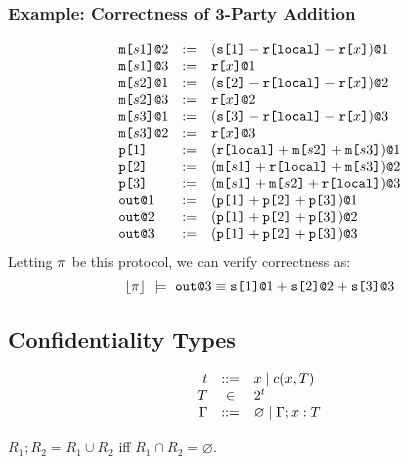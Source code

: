 \subsubsection{Example: Correctness of 3-Party Addition}

$$
\begin{array}{lll}
  \elab{\mesg{s1}}{2} &:=& \elab{(\secret{1} \fminus \locflip \fminus \flip{x})}{1} \\ 
  \elab{\mesg{s1}}{3} &:=& \elab{\flip{x}}{1} \\ 
  \elab{\mesg{s2}}{1} &:=& \elab{(\secret{2} \fminus \locflip \fminus \flip{x})}{2} \\ 
  \elab{\mesg{s2}}{3} &:=& \elab{\flip{x}}{2} \\ 
  \elab{\mesg{s3}}{1} &:=& \elab{(\secret{3} \fminus \locflip \fminus \flip{x})}{3} \\ 
  \elab{\mesg{s3}}{2} &:=& \elab{\flip{x}}{3}\\
  \rvl{1} &:=& \elab{(\locflip \fplus \mesg{s2} \fplus \mesg{s3})}{1} \\ 
  \rvl{2} &:=& \elab{(\mesg{s1} \fplus \locflip \fplus \mesg{s3})}{2} \\
  \rvl{3} &:=& \elab{(\mesg{s1} \fplus \mesg{s2} \fplus \locflip)}{3} \\
  \out{1} &:=& \elab{(\rvl{1} \fplus \rvl{2} + \rvl{3})}{1}\\
  \out{2} &:=& \elab{(\rvl{1} \fplus \rvl{2} + \rvl{3})}{2}\\
  \out{3} &:=& \elab{(\rvl{1} \fplus \rvl{2} + \rvl{3})}{3}
\end{array}
$$
Letting $\prog$ be this protocol, we can verify correctness
as:
$$
\toeq{\prog}\ \models\ \out{3} \eop \sx{1}{1} \fplus \sx{2}{2} \fplus \sx{3}{3}
$$

\subsection{Confidentiality Types}

$$
\begin{array}{rcl@{\hspace{2mm}}r}
  t &::=& x \mid \cty{x}{T} \\
  \ty & \in & 2^{t}\\
  \Gamma &::=& \varnothing \mid \Gamma; x : \ty
\end{array} 
$$

\begin{definition}
  $R_1;R_2 = R_1 \cup R_2$ iff $R_1 \cap R_2 = \varnothing$.
\end{definition}

